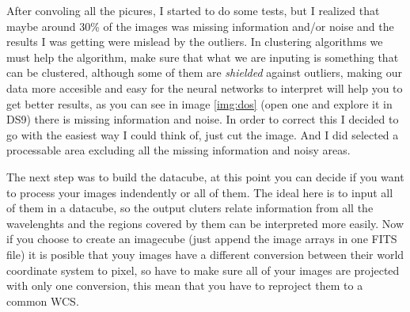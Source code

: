 \documentclass[11pt,fleqn]{book} %
\begin{document}
After convoling all the picures, I started to do some tests, but I realized that maybe around 30\% of the images was missing information and/or noise and the results I was getting were mislead by the outliers. In clustering algorithms we must help the algorithm, make sure that what we are inputing is something that can be clustered, although some of them are \emph{shielded} against outliers, making our data more accesible and easy for the neural networks to interpret will help you to get better results, as you can see in image \ref{img:dos} (open one and explore it in DS9) there is missing information and noise. In order to correct this I decided to go with the easiest way I could think of, just cut the image. And I did selected a processable area excluding all the missing information and noisy areas.



The next step was to build the datacube, at this point you can decide if you want to process your images indendently or all of them. The ideal here is to input all of them in a datacube, so the output cluters relate information from all the wavelenghts and the regions covered by them can be interpreted more easily. Now if you choose to create an imagecube (just append the image arrays in one FITS file) it is posible that youy images have a different conversion between their world coordinate system to pixel, so have to make sure all of your images are projected with only one conversion, this mean that you have to reproject them to a common WCS.
\end{document}
